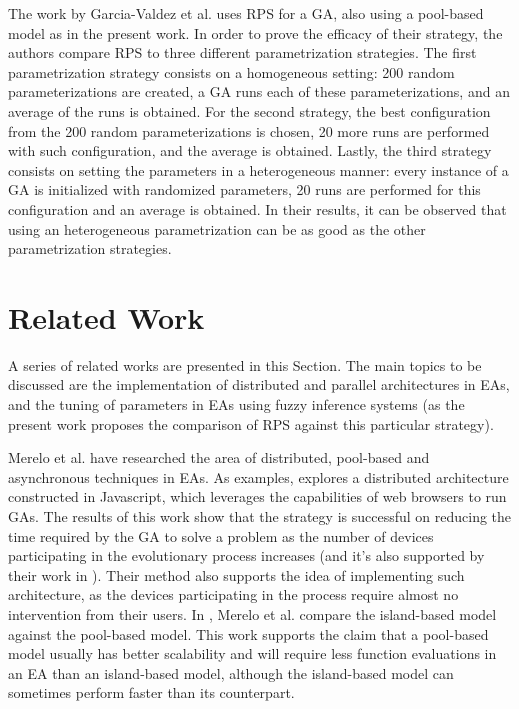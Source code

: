 The work by Garcia-Valdez et al. \cite{garcia2014randomized} uses RPS for a GA, also using a pool-based model as in the present work. In order to prove the efficacy of their strategy, the authors compare RPS to three different parametrization strategies. The first parametrization strategy consists on a homogeneous setting: 200 random parameterizations are created, a GA runs each of these parameterizations, and an average of the runs is obtained. For the second strategy, the best configuration from the 200 random parameterizations is chosen, 20 more runs are performed with such configuration, and the average is obtained. Lastly, the third strategy consists on setting the parameters in a heterogeneous manner: every instance of a GA is initialized with randomized parameters, 20 runs are performed for this configuration and an average is obtained. In their results, it can be observed that using an heterogeneous parametrization can be as good as the other parametrization strategies.
%
\section{Related Work}
\label{related-work}

A series of related works are presented in this Section. The main topics to be discussed are the implementation of distributed and parallel architectures in EAs, and the tuning of parameters in EAs using fuzzy inference systems (as the present work proposes the comparison of RPS against this particular strategy).

Merelo et al. have researched the area of distributed, pool-based and asynchronous techniques in EAs. As examples, \cite{merelo2008asynchronous} explores a distributed architecture constructed in Javascript, which leverages the capabilities of web browsers to run GAs. The results of this work show that the strategy is successful on reducing the time required by the GA to solve a problem as the number of devices participating in the evolutionary process increases (and it's also supported by their work in \cite{merelo2013designing}). Their method also supports the idea of implementing such architecture, as the devices participating in the process require almost no intervention from their users. In \cite{merelo2012pool}, Merelo et al. compare the island-based model against the pool-based model. This work supports the claim that a pool-based model usually has better scalability and will require less function evaluations in an EA than an island-based model, although the island-based model can sometimes perform faster than its counterpart.

